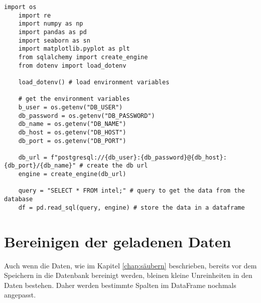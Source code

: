 \lstset{
	breaklines=true,         %
	breakatwhitespace=false, %
	basicstyle=\ttfamily,    %
}

\begin{lstlisting}[caption={\texttt{load data from the database}},captionpos=b]
    import os
    import re
    import numpy as np
    import pandas as pd
    import seaborn as sn
    import matplotlib.pyplot as plt
    from sqlalchemy import create_engine
    from dotenv import load_dotenv

    load_dotenv() # load environment variables

    # get the environment variables
    b_user = os.getenv("DB_USER")
    db_password = os.getenv("DB_PASSWORD")
    db_name = os.getenv("DB_NAME")
    db_host = os.getenv("DB_HOST")
    db_port = os.getenv("DB_PORT")

    db_url = f"postgresql://{db_user}:{db_password}@{db_host}:{db_port}/{db_name}" # create the db url
    engine = create_engine(db_url)

    query = "SELECT * FROM intel;" # query to get the data from the database
    df = pd.read_sql(query, engine) # store the data in a dataframe
\end{lstlisting}

\section{Bereinigen der geladenen Daten}\label{sec:bereinigen}
Auch wenn die Daten, wie im Kapitel \ref{chap:säubern} beschrieben, bereits vor dem Speichern in die Datenbank bereinigt werden, bleinen kleine
Unreinheiten in den Daten bestehen. Daher werden bestimmte Spalten im DataFrame nochmals angepasst.

